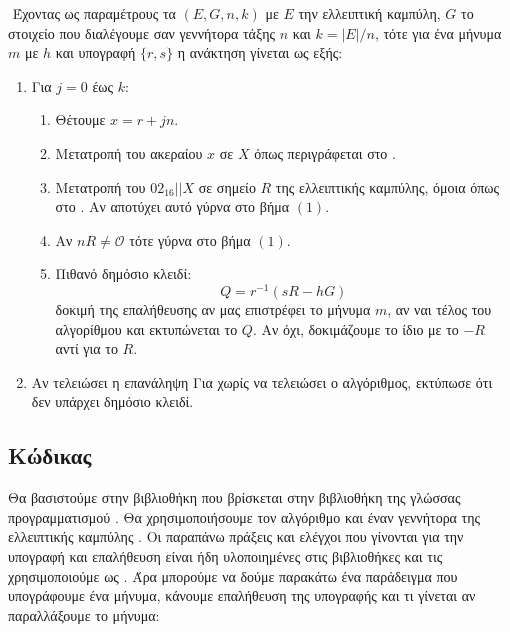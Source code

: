 \documentclass[oneside,a4paper]{article}
\begin{document}
$ $\newline
Έχοντας ως παραμέτρους τα $(E,G,n,k)$  με $E$ την ελλειπτική καμπύλη, $G$ το στοιχείο που διαλέγουμε σαν γεννήτορα τάξης $n$ και $k = |E|/n$, τότε για ένα μήνυμα $m$ με  $h$ και υπογραφή $\{r,s\}$ η ανάκτηση γίνεται ως εξής:

\vspace*{0.3cm}
\begin{enumerate}
	\item Για $j=0$ έως $k$:
	\begin{enumerate}
		\item Θέτουμε $x = r +jn$.
		\item Μετατροπή του ακεραίου $x$ σε  $X$ όπως περιγράφεται στο  \cite{sec1}. %
		\item Μετατροπή του  $02_{16}||X$ σε σημείο $R$ της ελλειπτικής καμπύλης, όμοια όπως στο \cite{sec1}. Αν αποτύχει αυτό γύρνα στο βήμα $(1)$.
		\item Αν $nR\neq \mathcal{O}$ τότε γύρνα στο βήμα $(1)$.
		\item Πιθανό δημόσιο κλειδί:
		$$Q = r^{-1}(sR - hG)$$
		δοκιμή της επαλήθευσης αν μας επιστρέφει το μήνυμα $m$, αν ναι τέλος του αλγορίθμου και εκτυπώνεται το $Q$. Αν όχι, δοκιμάζουμε το ίδιο με το $-R$ αντί για το $R$.
	\end{enumerate}
	\item Αν τελειώσει η επανάληψη Για χωρίς να τελειώσει ο αλγόριθμος, εκτύπωσε ότι δεν υπάρχει δημόσιο κλειδί.
\end{enumerate}

\subsection{Κώδικας}

\vspace*{0.3cm}
\noindent Θα βασιστούμε στην βιβλιοθήκη  που βρίσκεται στην βιβλιοθήκη  της γλώσσας προγραμματισμού . Θα χρησιμοποιήσουμε τον αλγόριθμο  και έναν γεννήτορα της ελλειπτικής καμπύλης . Οι παραπάνω πράξεις και ελέγχοι που γίνονται για την υπογραφή και επαλήθευση είναι ήδη υλοποιημένες στις βιβλιοθήκες και τις χρησιμοποιούμε ως . Άρα μπορούμε να δούμε παρακάτω ένα παράδειγμα που υπογράφουμε ένα μήνυμα, κάνουμε επαλήθευση της υπογραφής και τι γίνεται αν παραλλάξουμε το μήνυμα:
\end{document}
